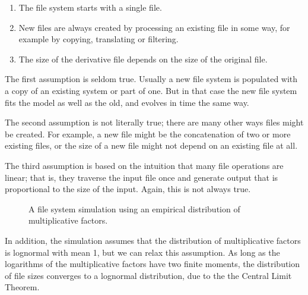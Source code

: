 \documentclass[10pt,twocolumn]{article}
\begin{document}
\begin{enumerate}

\item The file system starts with a single file.

\item New files are always created by processing an existing
file in some way, for example by copying, translating or filtering.

\item The size of the derivative file depends on the size of the
original file.

\end{enumerate}

The first assumption is seldom true.  Usually a new file system
is populated with a copy of an existing system or part of one.  But
in that case the new file system fits the model as well as
the old, and evolves in time the same way.

The second assumption is not literally true; there are many other ways
files might be created.  For example, a new file might be the
concatenation of two or more existing files, or the size of a new
file might not depend on an existing file at all.  

The third assumption is based on the intuition that many file
operations are linear; that is, they traverse the input file once
and generate output that is proportional to the size of the input.
Again, this is not always true.

\begin{figure}[tb]
\centerline{}
\caption{
A file system simulation using an empirical distribution of multiplicative factors.}
\label{fig.converge}
\end{figure}

In addition, the simulation assumes that the distribution
of multiplicative factors is lognormal with mean 1, but we can relax
this assumption.  As long as the logarithms of the multiplicative
factors have two finite moments, the distribution of file sizes
converges to a lognormal distribution, due to the the Central Limit
Theorem.
\end{document}

